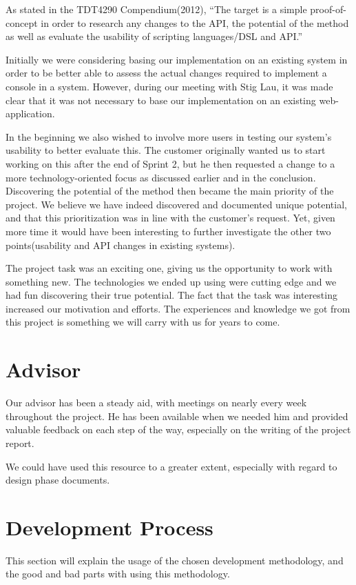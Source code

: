 As stated in the TDT4290 Compendium(2012), 
“The target is a simple proof-of-concept in order to research any changes to the API, the potential of the method as well as evaluate the usability of scripting languages/DSL and API.”

Initially we were considering basing our implementation on an existing system in order to be better able to assess the actual changes required to implement a console in a system. However, during our meeting with Stig Lau, it was made clear that it was not necessary to base our implementation on an existing web-application. 

In the beginning we also wished to involve more users in testing our system’s usability to better evaluate this. The customer originally wanted us to start working on this after the end of Sprint 2, but he then requested a change to a more technology-oriented focus as discussed earlier and in the conclusion. Discovering the potential of the method then became the main priority of the project. We believe we have indeed discovered and documented unique potential, and that this prioritization was in line with the customer’s request. Yet, given more time it would have been interesting to further investigate the other two points(usability and API changes in existing systems).


The project task was an exciting one, giving us the opportunity to work with something new. The technologies we ended up using were cutting edge and we had fun discovering their true potential. The fact that the task was interesting increased our motivation and efforts. The experiences and knowledge we got from this project is something we will carry with us for years to come.

\section{Advisor}
Our advisor has been a steady aid, with meetings on nearly every week throughout the project. He has been available when we needed him and provided valuable feedback on each step of the way, especially on the writing of the project report.

We could have used this resource to a greater extent, especially with regard to design phase documents.

\section{Development Process}
This section will explain the usage of the chosen development methodology, and the good and bad parts with using this methodology.

